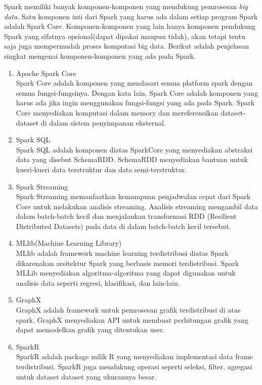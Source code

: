 Spark memiliki banyak komponen-komponen yang mendukung pemrosesan \textit{big data}. Satu komponen inti dari Spark yang harus ada dalam setiap program Spark adalah Spark Core. Komponen-komponen yang lain hanya komponen pendukung Spark yang sifatnya opsional(dapat dipakai maupun tidak), akan tetapi tentu saja juga mempermudah proses komputasi big data. Berikut adalah penjelasan singkat mengenai komponen-komponen yang ada pada Spark.
\begin{enumerate}
\item Apache Spark Core\\
Spark Core adalah komponen yang mendasari semua platform spark dengan semua fungsi-fungsinya. Dengan kata lain, Spark Core adalah komponen yang harus ada jika ingin menggunakan fungsi-fungsi yang ada pada Spark. Spark Core menyediakan komputasi dalam memory dan mereferensikan dataset-dataset di dalam sistem penyimpanan eksternal.
\item Spark SQL \\
Spark SQL adalah komponen diatas SparkCore yang menyediakan abstraksi data yang disebut SchemaRDD. SchemaRDD menyediakan bantuan untuk kueri-kueri data terstruktur dan data semi-terstruktur.
\item Spark Streaming\\
Spark Streaming memanfaatkan kemampuan penjadwalan cepat dari Spark Core untuk melakukan analisis streaming. Analisis streaming mengambil data dalam batch-batch kecil dan menjalankan transformasi RDD (Resilient Distributed Datasets) pada data di dalam batch-batch kecil tersebut.
\item MLlib(Machine Learning Library)\\
MLlib adalah framework machine learning terdistribusi diatas Spark dikarenakan arsitektur Spark yang berbasis memori terdistribusi. Spark MLLib menyediakan algoritma-algoritma yang dapat digunakan untuk analisis data seperti regresi, klasifikasi, dan lain-lain.
\item GraphX\\
GraphX adalah framework untuk pemrosesan grafik terdistribusi di atas spark. GraphX menyediakan API untuk membuat perhitungan grafik yang dapat memodelkan grafik yang ditentukan user.
\item SparkR\\
SparkR adalah package milik R yang menyediakan implementasi data frame terdistribusi. SparkR juga mendukung operasi seperti seleksi, filter, agregasi untuk dataset dataset yang ukurannya besar.

\end{enumerate}


